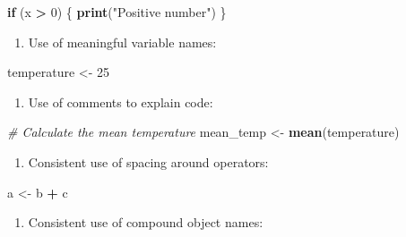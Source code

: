 \documentclass[
  10t,
]{article}
\newenvironment{Shaded}{\begin{snugshade}}{\end{snugshade}}
\newcommand{\CommentTok}[1]{\textcolor[rgb]{0.56,0.35,0.01}{\textit{#1}}}
\newcommand{\ControlFlowTok}[1]{\textcolor[rgb]{0.13,0.29,0.53}{\textbf{#1}}}
\newcommand{\DecValTok}[1]{\textcolor[rgb]{0.00,0.00,0.81}{#1}}
\newcommand{\FunctionTok}[1]{\textcolor[rgb]{0.13,0.29,0.53}{\textbf{#1}}}
\newcommand{\NormalTok}[1]{#1}
\newcommand{\OtherTok}[1]{\textcolor[rgb]{0.56,0.35,0.01}{#1}}
\newcommand{\SpecialCharTok}[1]{\textcolor[rgb]{0.81,0.36,0.00}{\textbf{#1}}}
\newcommand{\StringTok}[1]{\textcolor[rgb]{0.31,0.60,0.02}{#1}}
\providecommand{\tightlist}{%
  \setlength{\itemsep}{0pt}\setlength{\parskip}{0pt}}\usepackage{longtable,booktabs,array}
\begin{document}
\begin{Shaded}
\begin{Highlighting}[]
\ControlFlowTok{if}\NormalTok{ (x }\SpecialCharTok{\textgreater{}} \DecValTok{0}\NormalTok{) \{}
  \FunctionTok{print}\NormalTok{(}\StringTok{"Positive number"}\NormalTok{)}
\NormalTok{\}}
\end{Highlighting}
\end{Shaded}

\begin{enumerate}
\def\labelenumi{\arabic{enumi}.}
\setcounter{enumi}{1}
\tightlist
\item
  Use of meaningful variable names:
\end{enumerate}

\begin{Shaded}
\begin{Highlighting}[]
\NormalTok{temperature }\OtherTok{\textless{}{-}} \DecValTok{25}
\end{Highlighting}
\end{Shaded}

\begin{enumerate}
\def\labelenumi{\arabic{enumi}.}
\setcounter{enumi}{2}
\tightlist
\item
  Use of comments to explain code:
\end{enumerate}

\begin{Shaded}
\begin{Highlighting}[]
\CommentTok{\# Calculate the mean temperature}
\NormalTok{mean\_temp }\OtherTok{\textless{}{-}} \FunctionTok{mean}\NormalTok{(temperature)}
\end{Highlighting}
\end{Shaded}

\begin{enumerate}
\def\labelenumi{\arabic{enumi}.}
\setcounter{enumi}{3}
\tightlist
\item
  Consistent use of spacing around operators:
\end{enumerate}

\begin{Shaded}
\begin{Highlighting}[]
\NormalTok{a }\OtherTok{\textless{}{-}}\NormalTok{ b }\SpecialCharTok{+}\NormalTok{ c}
\end{Highlighting}
\end{Shaded}

\begin{enumerate}
\def\labelenumi{\arabic{enumi}.}
\setcounter{enumi}{4}
\tightlist
\item
  Consistent use of compound object names:
\end{enumerate}
\end{document}
